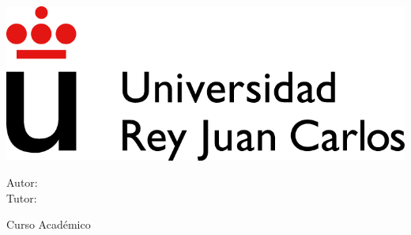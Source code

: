 
\begin{titlepage}
\begin{center}
\includegraphics[scale=0.6]{./images/URJ_logo_Color_POS.png}

\vspace{1.25cm}

\Large
\MakeUppercase{\school}

\vspace{1.25cm}

\Large
\MakeUppercase{\program}

\vspace{1.25cm}

\Large
\MakeUppercase{\textbf{\type}}

\vspace{1.25cm}

\LARGE
\docTitle

\vspace{1.25cm}

\large
Autor: \docAuthor \\
Tutor: \tutor

\vspace{1.25cm}

\large
Curso Académico \dateCourse
\end{center}
\end{titlepage}

\newpage
\mbox{}
\thispagestyle{empty} %